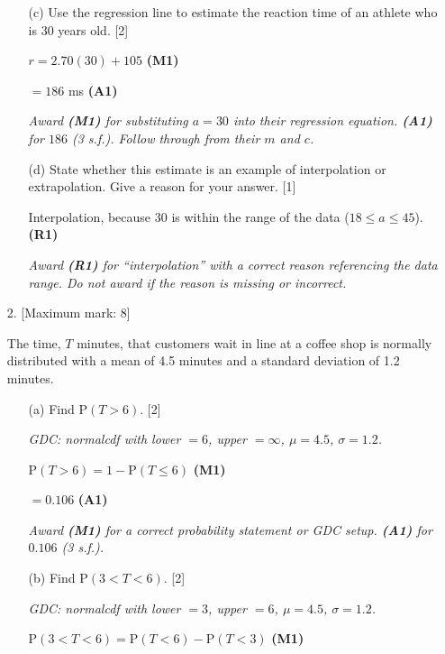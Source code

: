 \documentclass[12pt, twoside]{article}
\begin{document}
\begin{enumerate}[itemsep=0.15cm]
\begin{enumerate}[itemsep=0.3cm]
  \item[(c)] Use the regression line to estimate the reaction time
  of an athlete who is 30 years old. \hfill [2]

  $r = 2.70(30) + 105$ \hfill \textbf{(M1)}

  $= 186$ ms \hfill \textbf{(A1)}

  \textit{Award \textbf{(M1)} for substituting $a = 30$ into their regression equation.
  \textbf{(A1)} for $186$ (3 s.f.). Follow through from their $m$ and $c$.}

  \item[(d)] State whether this estimate is an example of interpolation or
  extrapolation. Give a reason for your answer. \hfill [1]

  Interpolation, because $30$ is within the range of the data
  ($18 \leq a \leq 45$). \hfill \textbf{(R1)}

  \textit{Award \textbf{(R1)} for ``interpolation'' with a correct reason referencing
  the data range. Do not award if the reason is missing or incorrect.}
\end{enumerate}

\newpage

\item[2.] [Maximum mark: 8]

The time, $T$ minutes, that customers wait in line at a coffee shop
is normally distributed with a mean of 4.5 minutes and a standard deviation
of 1.2 minutes.

\begin{enumerate}[itemsep=0.3cm]
  \item[(a)] Find $\mathrm{P}(T > 6)$. \hfill [2]

  \textit{GDC: normalcdf with lower $= 6$, upper $= \infty$, $\mu = 4.5$, $\sigma = 1.2$.}

  $\mathrm{P}(T > 6) = 1 - \mathrm{P}(T \leq 6)$ \hfill \textbf{(M1)}

  $= 0.106$ \hfill \textbf{(A1)}

  \textit{Award \textbf{(M1)} for a correct probability statement or GDC setup.
  \textbf{(A1)} for $0.106$ (3 s.f.).}

  \item[(b)] Find $\mathrm{P}(3 < T < 6)$. \hfill [2]

  \textit{GDC: normalcdf with lower $= 3$, upper $= 6$, $\mu = 4.5$, $\sigma = 1.2$.}

  $\mathrm{P}(3 < T < 6) = \mathrm{P}(T < 6) - \mathrm{P}(T < 3)$ \hfill \textbf{(M1)}


\end{enumerate}
\end{enumerate}
\end{document}
